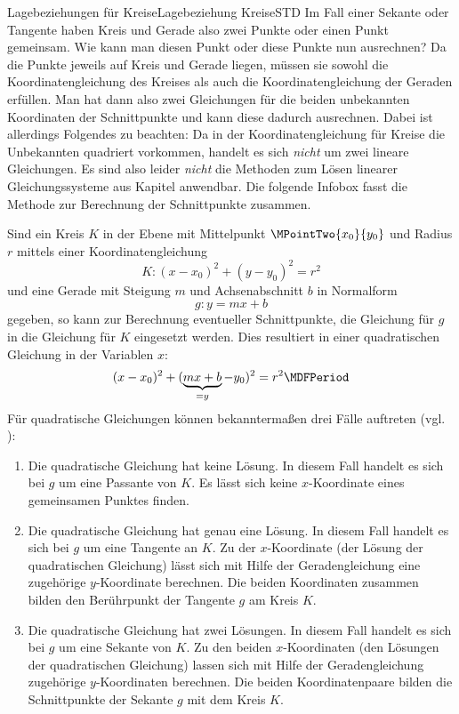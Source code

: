 \begin{MXContent}{Lagebeziehungen für Kreise}{Lagebeziehung Kreise}{STD}
Im Fall einer Sekante oder Tangente haben Kreis und Gerade also zwei Punkte oder einen Punkt gemeinsam. Wie kann man diesen Punkt oder diese Punkte nun ausrechnen? Da die Punkte jeweils auf Kreis und Gerade liegen, müssen sie sowohl die Koordinatengleichung des Kreises als auch die Koordinatengleichung der Geraden erfüllen. Man hat dann also zwei Gleichungen für die beiden unbekannten Koordinaten der Schnittpunkte und kann diese dadurch ausrechnen. Dabei ist allerdings Folgendes zu beachten: Da in der Koordinatengleichung für Kreise die Unbekannten quadriert vorkommen, handelt es sich \textit{nicht} um zwei lineare Gleichungen. Es sind also leider \textit{nicht} die Methoden zum Lösen linearer Gleichungssysteme aus Kapitel  anwendbar. Die folgende Infobox fasst die Methode zur Berechnung der Schnittpunkte zusammen.

\begin{MInfo}
 Sind ein Kreis $K$ in der Ebene mit Mittelpunkt $\MPointTwo{x_0}{y_0}$ und Radius $r$ mittels einer Koordinatengleichung
\[
 K\colon (x-x_0)^2+(y-y_0)^2=r^2
\]
und eine Gerade mit Steigung $m$ und Achsenabschnitt $b$ in Normalform
\[
 g\colon y=m x+b
\]
gegeben, so kann zur Berechnung eventueller Schnittpunkte, die Gleichung für $g$ in die Gleichung für $K$ eingesetzt werden. Dies resultiert in einer quadratischen Gleichung in der Variablen $x$:
\[
 (x-x_0)^2+(\underbrace{m x+b}_{=y}-y_0)^2=r^2\MDFPeriod
\]
Für quadratische Gleichungen können bekanntermaßen drei Fälle auftreten (vgl. ):
\begin{enumerate}
 \item Die quadratische Gleichung hat keine Lösung. In diesem Fall handelt es sich bei $g$ um eine Passante von $K$. Es lässt sich keine $x$-Koordinate eines gemeinsamen Punktes finden.
 \item Die quadratische Gleichung hat genau eine Lösung. In diesem Fall handelt es sich bei $g$ um eine Tangente an $K$. Zu der $x$-Koordinate (der Lösung der quadratischen Gleichung) lässt sich mit Hilfe der Geradengleichung eine zugehörige $y$-Koordinate berechnen. Die beiden Koordinaten zusammen bilden den Berührpunkt der Tangente $g$ am Kreis $K$.
 \item Die quadratische Gleichung hat zwei Lösungen. In diesem Fall handelt es sich bei $g$ um eine Sekante von $K$. Zu den beiden $x$-Koordinaten (den Lösungen der quadratischen Gleichung) lassen sich mit Hilfe der Geradengleichung zugehörige $y$-Koordinaten berechnen. Die beiden Koordinatenpaare bilden die Schnittpunkte der Sekante $g$ mit dem Kreis $K$. 
\end{enumerate}


\end{MInfo}
\end{MXContent}
